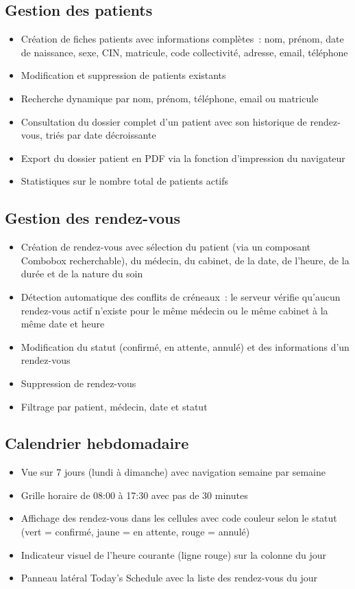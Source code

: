 \subsection{Gestion des patients}
\begin{itemize}
    \item Création de fiches patients avec informations complètes~: nom, prénom, date de naissance, sexe, CIN, matricule, code collectivité, adresse, email, téléphone
    \item Modification et suppression de patients existants
    \item Recherche dynamique par nom, prénom, téléphone, email ou matricule
    \item Consultation du dossier complet d'un patient avec son historique de rendez-vous, triés par date décroissante
    \item Export du dossier patient en PDF via la fonction d'impression du navigateur
    \item Statistiques sur le nombre total de patients actifs
\end{itemize}

\subsection{Gestion des rendez-vous}
\begin{itemize}
    \item Création de rendez-vous avec sélection du patient (via un composant Combobox recherchable), du médecin, du cabinet, de la date, de l'heure, de la durée et de la nature du soin
    \item Détection automatique des conflits de créneaux~: le serveur vérifie qu'aucun rendez-vous actif n'existe pour le même médecin ou le même cabinet à la même date et heure
    \item Modification du statut (confirmé, en attente, annulé) et des informations d'un rendez-vous
    \item Suppression de rendez-vous
    \item Filtrage par patient, médecin, date et statut
\end{itemize}

\subsection{Calendrier hebdomadaire}
\begin{itemize}
    \item Vue sur 7 jours (lundi à dimanche) avec navigation semaine par semaine
    \item Grille horaire de 08:00 à 17:30 avec pas de 30 minutes
    \item Affichage des rendez-vous dans les cellules avec code couleur selon le statut (vert = confirmé, jaune = en attente, rouge = annulé)
    \item Indicateur visuel de l'heure courante (ligne rouge) sur la colonne du jour
    \item Panneau latéral \og Today's Schedule \fg{} avec la liste des rendez-vous du jour
\end{itemize}

